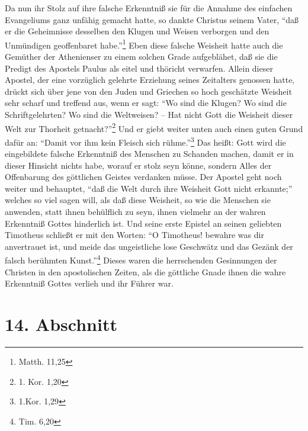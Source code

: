 Da nun ihr Stolz auf ihre falsche Erkenntniß sie für die Annahme des einfachen Evangeliums ganz unfähig gemacht hatte, so dankte Christus seinem Vater, "`daß er die Geheimnisse desselben den Klugen und Weisen verborgen und den Unmündigen geoffenbaret habe."'\footnote{Matth. 11,25} Eben diese falsche Weisheit hatte auch die Gemüther der Athenienser zu einem solchen Grade aufgeblähet, daß sie die Predigt des Apostels Paulus als eitel und thöricht verwarfen. Allein dieser Apostel, der eine vorzüglich gelehrte Erziehung seines Zeitalters genossen hatte, drückt sich über jene von den Juden und Griechen so hoch geschätzte Weisheit sehr scharf und treffend aus, wenn er sagt: "`Wo sind die Klugen? Wo sind die Schriftgelehrten? Wo sind die Weltweisen? -- Hat nicht Gott die Weisheit dieser Welt zur Thorheit getnacht?"'\footnote{1. Kor. 1,20} Und er giebt weiter unten auch einen guten Grund dafür an: "`Damit vor ihm kein Fleisch sich rühme."'\footnote{1.Kor. 1,29} Das heißt: Gott wird die eingebildete falsche Erkenntniß des Menschen zu Schanden machen, damit er in dieser Hinsicht nichts habe, worauf er stolz seyn könne, sondern Alles der Offenbarung des göttlichen Geistes verdanken müsse. Der Apostel geht noch weiter und behauptet, "`daß die Welt durch ihre Weisheit Gott nicht erkannte;"' welches so viel sagen will, als daß diese Weisheit, so wie die Menschen sie anwenden, statt ihnen behülflich zu seyn, ihnen vielmehr an der wahren Erkenntniß Gottes hinderlich ist. Und seine erste Epistel an seinen geliebten Timotheus schließt er mit den Worten: "`O Timotheus! bewahre was dir anvertrauet ist, und meide das ungeistliche lose Geschwätz und das Gezänk der falsch berühmten Kunst."'\footnote{Tim. 6,20} Dieses waren die herrschenden Gesinnungen der Christen in den apostolischen Zeiten, als die göttliche Gnade ihnen die wahre Erkenntniß Gottes verlieh und ihr Führer war.

\section{14. Abschnitt}

